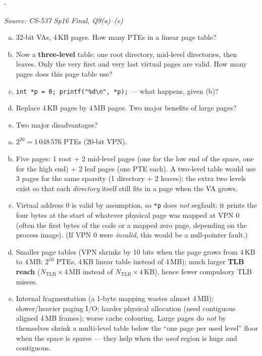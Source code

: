 \documentclass[11pt,a4paper]{article}
\makeatletter
\newcommand{\keepspace}[1]{\par\penalty-100\begingroup
  \setlength{\dimen@}{#1}\dimen@ii\pagegoal\advance\dimen@ii-\pagetotal
  \ifdim\dimen@>\dimen@ii\ifdim\dimen@ii>\z@\vfil\fi\break\fi\endgroup}
\newcounter{qn}[section]
\newenvironment{Qn}[4]{%
  \refstepcounter{qn}\keepspace{7\baselineskip}%
  \begin{tcolorbox}[qboxstyle, title={Q\thesection.\theqn\ \ [#1 \textbar\ #2]\ \ #4}]%
  {\footnotesize\color{g3}\textit{Source: #3}}\par\smallskip%
}{%
  \end{tcolorbox}%
}
\newenvironment{Sol}{%
  \begin{tcolorbox}[sboxstyle, title={Solution}]%
}{%
  \end{tcolorbox}\vspace{0.35em}%
}
\makeatother
\begin{document}
\begin{Qn}{Medium-Hard}{Lect 14}{CS-537 Sp16 Final, Q9(a)--(e)}{Three-level table for two valid pages; large-page trade-off}
\begin{enumerate}[(a)]
\item 32-bit VAs, 4\,KB pages. How many PTEs in a linear page table?
\item Now a \textbf{three-level} table: one root directory, mid-level
      directories, then leaves. Only the very first and very last
      virtual pages are valid. How many pages does this page table use?
\item \texttt{int *p = 0; printf("\%d\textbackslash n", *p);} --- what
      happens, given (b)?
\item Replace 4\,KB pages by 4\,MB pages. Two major benefits of large
      pages?
\item Two major disadvantages?
\end{enumerate}
\end{Qn}
\begin{Sol}
\begin{enumerate}[(a)]
\item $2^{20} = 1\,048\,576$ PTEs (20-bit VPN).
\item Five pages: 1 root $+$ 2 mid-level pages (one for the low end of
      the space, one for the high end) $+$ 2 leaf pages (one PTE each).
      A two-level table would use 3 pages for the same sparsity (1
      directory $+$ 2 leaves); the extra two levels exist so that each
      \emph{directory} itself still fits in a page when the VA grows.
\item Virtual address 0 is valid by assumption, so \texttt{*p} does
      \emph{not} segfault: it prints the four bytes at the start of
      whatever physical page was mapped at VPN 0 (often the first
      bytes of the code or a mapped zero page, depending on the
      process image). (If VPN 0 were \emph{invalid}, this would be a
      null-pointer fault.)
\item Smaller page tables (VPN shrinks by 10 bits when the page grows
      from 4\,KB to 4\,MB: $2^{10}$ PTEs, 4\,KB linear table instead of
      4\,MB); much larger \textbf{TLB reach}
      ($N_{\mathrm{TLB}}\times 4\,\mathrm{MB}$ instead of
      $N_{\mathrm{TLB}}\times 4\,\mathrm{KB}$), hence fewer compulsory
      TLB misses.
\item Internal fragmentation (a 1-byte mapping wastes almost 4\,MB);
      slower/heavier paging I/O; harder physical allocation (need
      contiguous aligned 4\,MB frames); worse cache colouring. Large
      pages do \emph{not} by themselves shrink a multi-level table
      below the ``one page per used level'' floor when the space is
      sparse --- they help when the \emph{used} region is huge and
      contiguous.
\end{enumerate}
\end{Sol}
\end{document}
